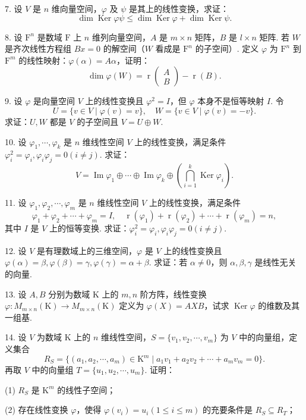 \documentclass[UTF8,12pt,a4paper,fontset=fandol]{ctexart}
\begin{document}
7. 设 $V$ 是 $n$ 维向量空间，$\varphi$ 及 $\psi$ 是其上的线性变换，求证：
\[
\dim\operatorname{Ker}\varphi\psi\le\dim\operatorname{Ker}\varphi+\dim\operatorname{Ker}\psi.
\]

8. 设 $\mathrm{F}^n$ 是数域 $\mathrm{F}$ 上 $n$ 维列向量空间，$A$ 是 $m\times n$ 矩阵，$B$ 是 $l\times n$ 矩阵. 若 $W$ 是齐次线性方程组 $Bx=0$ 的解空间（$W$ 看成是 $\mathrm{F}^n$ 的子空间）. 定义 $\varphi$ 为 $\mathrm{F}^n$ 到 $\mathrm{F}^m$ 的线性映射：$\varphi(\alpha)=A\alpha$，证明：
\[
\dim\varphi(W)=\operatorname{r}\left(\begin{array}{c}A\\B\end{array}\right)-\operatorname{r}(B).
\]

9. 设 $\varphi$ 是向量空间 $V$ 上的线性变换且 $\varphi^2=I$，但 $\varphi$ 本身不是恒等映射 $I$. 令
\[
U=\{v\in V\mid \varphi(v)=v\},\quad W=\{v\in V\mid \varphi(v)=-v\}.
\]
求证：$U,W$ 都是 $V$ 的子空间且 $V=U\oplus W$.

10. 设 $\varphi_1,\cdots,\varphi_k$ 是 $n$ 维线性空间 $V$ 上的线性变换，满足条件 $\varphi_i^2=\varphi_i,\varphi_i\varphi_j=0(i\ne j)$. 求证：
\[
V=\operatorname{Im}\varphi_1\oplus\cdots\oplus\operatorname{Im}\varphi_k\oplus\left(\bigcap_{i=1}^k\operatorname{Ker}\varphi_i\right).
\]

11. 设 $\varphi_1,\varphi_2,\cdots,\varphi_m$ 是 $n$ 维线性空间 $V$ 上的线性变换，满足条件
\[
\varphi_1+\varphi_2+\cdots+\varphi_m=I,\quad
\operatorname{r}(\varphi_1)+\operatorname{r}(\varphi_2)+\cdots+\operatorname{r}(\varphi_m)=n,
\]
其中 $I$ 是 $V$ 上的恒等变换. 求证：$\varphi_i^2=\varphi_i,\varphi_i\varphi_j=0(i\ne j)$.

12. 设 $V$ 是有理数域上的三维空间，$\varphi$ 是 $V$ 上的线性变换且 $\varphi(\alpha)=\beta,\varphi(\beta)=\gamma,\varphi(\gamma)=\alpha+\beta$. 求证：若 $\alpha\ne0$，则 $\alpha,\beta,\gamma$ 是线性无关的向量.

13. 设 $A,B$ 分别为数域 $\mathrm{K}$ 上的 $m,n$ 阶方阵，线性变换 $\varphi:M_{m\times n}(\mathrm{K})\to M_{m\times n}(\mathrm{K})$ 定义为 $\varphi(X)=AXB$，试求 $\operatorname{Ker}\varphi$ 的维数及其一组基.

14. 设 $V$ 为数域 $\mathrm{K}$ 上的 $n$ 维线性空间，$S=\{v_1,v_2,\cdots,v_m\}$ 为 $V$ 中的向量组，定义集合
\[
R_S=\{(a_1,a_2,\cdots,a_m)\in\mathrm{K}^m\mid a_1v_1+a_2v_2+\cdots+a_mv_m=0\}.
\]
再取 $V$ 中的向量组 $T=\{u_1,u_2,\cdots,u_m\}$. 证明：

(1) $R_S$ 是 $\mathrm{K}^m$ 的线性子空间；

(2) 存在线性变换 $\varphi$，使得 $\varphi(v_i)=u_i(1\le i\le m)$ 的充要条件是 $R_S\subseteq R_T$；
\end{document}
